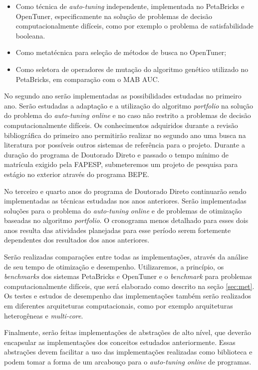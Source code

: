 \documentclass[a4paper, 12pt]{article}
\begin{document}
\begin{itemize}
    \item Como técnica de \emph{auto-tuning} independente, implementada
        no PetaBricks e OpenTuner, especificamente na solução de problemas
        de decisão computacionalmente difíceis, como por exemplo o problema
        de satisfabilidade booleana.
    \item Como metatécnica para seleção de métodos de busca no OpenTuner;
    \item Como seletora de operadores de mutação do algoritmo genético
        utilizado no PetaBricks, em comparação com o MAB AUC.
\end{itemize}

No segundo ano serão implementadas as possibilidades estudadas no primeiro ano.
Serão estudadas a adaptação e a utilização do algoritmo \emph{portfolio} na
solução do problema do \emph{auto-tuning online} e no caso não restrito a
problemas de decisão computacionalmente difíceis. Os conhecimentos adquiridos
durante a revisão bibliográfica do primeiro ano permitirão realizar no segundo
ano uma busca na literatura por possíveis outros sistemas de referência para o
projeto. Durante a duração do programa de Doutorado Direto e passado o tempo
mínimo de matrícula exigido pela FAPESP, submeteremos um projeto de pesquisa
para estágio no exterior através do programa BEPE.

No terceiro e quarto anos do programa de Doutorado Direto continuarão sendo
implementadas as técnicas estudadas nos anos anteriores. Serão implementadas
soluções para o problema do \emph{auto-tuning online} e de problemas de
otimização baseadas no algoritmo \emph{portfolio}. O cronograma menos detalhado
para esses dois anos resulta das atividades planejadas para esse período serem
fortemente dependentes dos resultados dos anos anteriores.

Serão realizadas comparações entre todas as implementações, através da análise
de seu tempo de otimização e desempenho. Utilizaremos, a princípio, os
\emph{benchmarks} dos sistemas PetaBricks e OpenTuner e o \emph{benchmark} para
problemas computacionalmente difíceis, que será elaborado como descrito na
seção \ref{sec:met}. Os testes e estudos de desempenho das implementações
também serão realizados em diferentes arquiteturas computacionais, como por
exemplo arquiteturas heterogêneas e \emph{multi-core}.

Finalmente, serão feitas implementações de abstrações de alto
nível, que deverão encapsular as implementações dos conceitos estudados
anteriormente. Essas abstrações devem facilitar a uso das implementações
realizadas como biblioteca e podem tomar a forma de um arcabouço para o
\emph{auto-tuning online} de programas.
\end{document}

